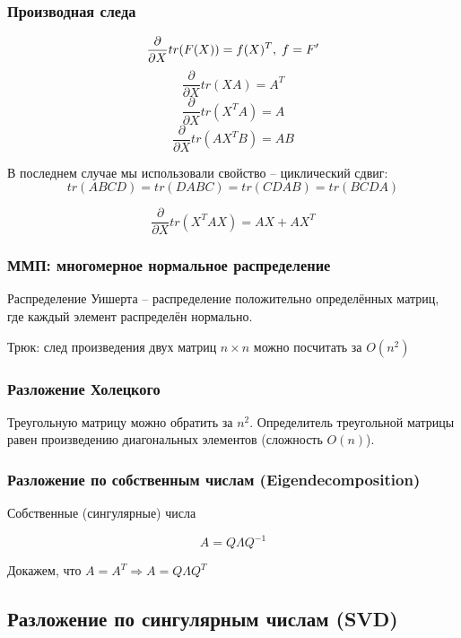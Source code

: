\documentclass[main.tex]{subfiles}
\begin{document}

\subsubsection{ Производная следа }

\[ \frac{\partial}{\partial X} tr(F(X)) = f(X)^T, \thickspace f = F' \]
\[ \frac{\partial}{\partial X} tr(XA) = A^T \]
\[ \frac{\partial}{\partial X} tr(X^T A) = A \]
\[ \frac{\partial}{\partial X} tr(AX^T B) = AB \]

В последнем случае мы использовали свойство -- циклический сдвиг:
\[ tr(ABCD) = tr(DABC) = tr(CDAB) = tr(BCDA) \]

\[ \frac{ \partial }{ \partial X } tr(X^T AX) = AX + AX^T \]

\subsubsection{ ММП: многомерное нормальное распределение }

Распределение Уишерта -- распределение положительно определённых матриц, где каждый элемент распределён нормально.

Трюк: след произведения двух матриц $ n \times n $ можно посчитать за $ O(n^2) $

\subsubsection{ Разложение Холецкого }

Треугольную матрицу можно обратить за $ n^2 $.
Определитель треугольной матрицы равен произведению диагональных элементов (сложность $ O(n) $).

\subsubsection{ Разложение по собственным числам (Eigendecomposition) }

Собственные (сингулярные) числа

\[ A = Q \Lambda Q^{-1} \]

Докажем, что $ A = A^T \Rightarrow A  = Q \Lambda Q^T $

\subsection{ Разложение по сингулярным числам (SVD) }
\end{document}
